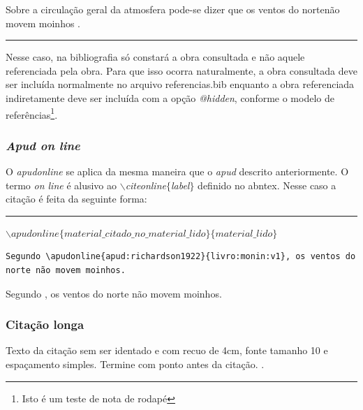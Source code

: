 \documentclass[oneside,openright,12pt]{ufsm_2021} %
\begin{document}
  Sobre a circulação geral da atmosfera pode-se dizer que os ventos do nortenão movem moinhos .
\begin{center}\rule{0.5\textwidth}{1pt}\end{center}  
  \par Nesse caso, na bibliografia só constará a obra consultada e não aquele referenciada pela obra. Para que isso ocorra naturalmente, a obra consultada deve ser incluída normalmente no arquivo referencias.bib enquanto a obra referenciada indiretamente deve ser incluída com a opção \textit{@hidden}, conforme o modelo de referências\footnote{Isto é um teste de nota de rodapé}.

      \subsubsection{\textit{Apud on line}}

      
      \par O \textit{apudonline} se aplica da mesma maneira que o \textit{apud} descrito anteriormente. O termo \textit{on line} é alusivo ao \textit{$\backslash$citeonline$\{$label$\}$} definido no abntex. Nesse caso a citação é feita da seguinte forma:
      \begin{center}
      \rule{0.5\textwidth}{1pt}
            $\backslash apudonline\{material\_citado\_no\_material\_lido\}\{material\_lido\}$ \\
	    \end{center}

 \begin{verbatim}
Segundo \apudonline{apud:richardson1922}{livro:monin:v1}, os ventos do
norte não movem moinhos.
\end{verbatim}

            Segundo , os ventos do norte não movem moinhos.

\subsubsection{Citação longa}
	
	\begin{quoting}[rightmargin=0cm,leftmargin=4cm]
		\begin{singlespace}
			{\footnotesize
				\noindent Texto da citação sem ser identado e com recuo de 4cm, fonte tamanho 10 e espaçamento simples.  \lipsum[2] Termine com ponto antes da citação.  \cite{man:MDTUFSM2015}.
			}
		\end{singlespace}
	\end{quoting}
\end{document}
